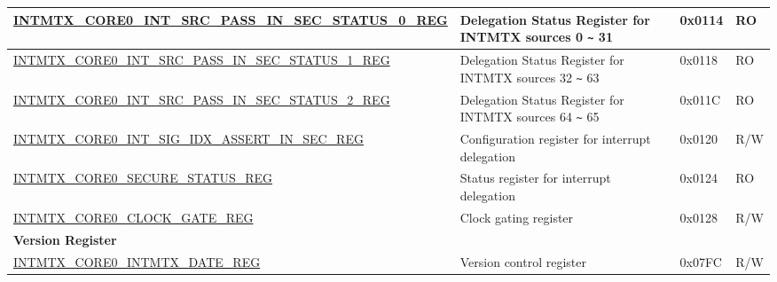 \begin{longtable}{ | p{10cm} | p{10cm} | p{1.3cm} | p{1cm} | }
\hyperref[regdesc:INTMTXCORE0SRCPASSINSECSTATUS0REG]{INTMTX\_CORE0\_INT\_SRC\_PASS\_IN\_SEC\_STATUS\_0\_REG} & Delegation Status Register for INTMTX sources 0 \verb+~+ 31 & 0x0114 & RO \\ \hline
\hyperref[regdesc:INTMTXCORE0SRCPASSINSECSTATUS1REG]{INTMTX\_CORE0\_INT\_SRC\_PASS\_IN\_SEC\_STATUS\_1\_REG} & Delegation Status Register for INTMTX sources 32 \verb+~+ 63 & 0x0118 & RO \\ \hline
\hyperref[regdesc:INTMTXCORE0SRCPASSINSECSTATUS2REG]{INTMTX\_CORE0\_INT\_SRC\_PASS\_IN\_SEC\_STATUS\_2\_REG} & Delegation Status Register for INTMTX sources 64 \verb+~+ 65 & 0x011C & RO \\ \hline
\hyperref[regdesc:INTMTXCORE0INTSIGIDXASSERTINSECREG]{INTMTX\_CORE0\_INT\_SIG\_IDX\_ASSERT\_IN\_SEC\_REG} & Configuration register for interrupt delegation & 0x0120 & R/W \\ \hline
\hyperref[regdesc:INTMTXCORE0SECURESTATUSREG]{INTMTX\_CORE0\_SECURE\_STATUS\_REG} & Status register for interrupt delegation & 0x0124 & RO \\ \hline
\hyperref[regdesc:INTMTXCORE0CLOCKGATEREG]{INTMTX\_CORE0\_CLOCK\_GATE\_REG} & Clock gating register & 0x0128 & R/W \\ \hline
\multicolumn{4}{|l|}{\textbf{Version Register}} \\ \hline
\hyperref[regdesc:INTMTXCORE0INTMTXDATEREG]{INTMTX\_CORE0\_INTMTX\_DATE\_REG} & Version control register & 0x07FC & R/W \\ \hline
\end{longtable}
